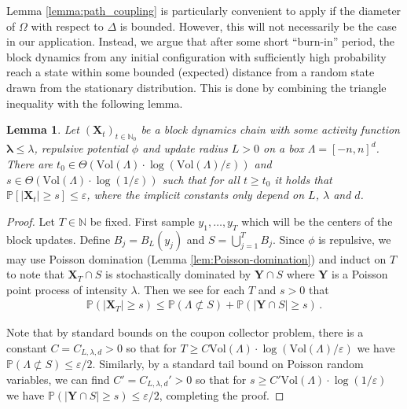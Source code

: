 \documentclass[10pt]{amsart}
\newtheorem{lemma}[theorem]{Lemma}
\theoremstyle{definition}
\theoremstyle{remark}
\def\eps{{\varepsilon}}
\newcommand{\bX}{\mathbf{X}}
\newcommand{\bY}{\mathbf{Y}}
\renewcommand{\P}{\mathbb{P}}
\newcommand{\N}{\mathbb{N}}
\newcommand{\region}{\Lambda}
\newcommand{\potential}{\phi}
\newcommand{\activity}{\lambda}
\newcommand{\activities}{\pmb{\lambda}}
\newcommand{\size}[1]{\left\lvert#1\right\rvert}
\newcommand{\vol}{\mathrm{Vol}}
\begin{document}
	Lemma \ref{lemma:path_coupling} is particularly convenient to apply if the diameter of $\Omega$ with respect to $\Delta$ is bounded.
	However, this will not necessarily be the case in our application.
	Instead, we argue that after some short ``burn-in'' period, the block dynamics from any initial configuration with sufficiently high probability reach a state within some bounded (expected) distance from a random state drawn from the stationary distribution.
	This is done by combining the triangle inequality with the following lemma.
	\begin{lemma}\label{lemma:burn_in}
		Let $(\bX_t)_{t \in \N_0}$ be a block dynamics chain with some activity function $\activities \le \activity$, repulsive potential $\potential$ and update radius $L > 0$ on a box $\region = [-n, n]^d$.
		There are $t_0 \in \Theta(\vol(\region) \cdot \log(\vol(\region)/\varepsilon))$ and $s \in \Theta(\vol(\region) \cdot \log(1/\varepsilon))$ such that for all $t \ge t_0$ it holds that $\P[\size{\bX_t} \ge s] \le \varepsilon$, where the implicit constants only depend on $L$, $\activity$ and $d$.
	\end{lemma}
	\begin{proof}
		Let $T \in \mathbb{N}$ be fixed.  First sample $y_1,\ldots,y_{T}$ which will be the centers of the block updates.  Define $B_j = B_L(y_j)$ and $S = \bigcup_{j = 1}^{T} B_j$.  Since $\phi$ is repulsive, we may use Poisson domination (Lemma \ref{lem:Poisson-domination}) and induct on $T$ to note that $\bX_T \cap S$ is stochastically dominated by $\bY \cap S$ where $\bY$ is a Poisson point process of intensity $\lambda$.  Then we see for each $T$ and $s > 0$ that \begin{align*}
			\P(|\bX_T| \geq s) \leq \P(\Lambda \not\subset S) + \P(|\bY \cap S| \geq s)\,.
		\end{align*}
		
		Note that by standard bounds on the coupon collector problem, there is a constant $C = C_{L,\lambda,d} > 0$ so that for $T \geq C \vol(\Lambda) \cdot \log(\vol(\Lambda)/\eps)$ we have $\P(\Lambda \not\subset S)  \leq \eps/2$.  Similarly, by a standard tail bound on Poisson random variables, we can find  $C' = C_{L,\lambda,d}' > 0$ so that for $s \geq C'\vol(\Lambda) \cdot \log(1/\eps)$ we have $\P(|\bY \cap S| \geq s) \leq \eps/2$, completing the proof.
	\end{proof}
	
\end{document}
